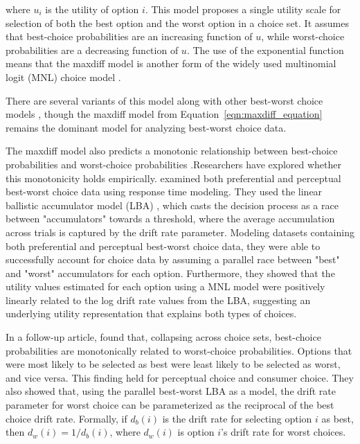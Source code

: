 where $u_{i}$ is the utility of option $i$. This model proposes a single utility scale  for selection of both the best option and the worst option in a choice set. It assumes that best-choice probabilities are an increasing function of $u$, while worst-choice probabilities are a decreasing function of $u$. The use of the exponential function means that the maxdiff model is another form of the widely used multinomial logit (MNL) choice model \parencite{hausman1984specification}. 

There are several variants of this model along with other best-worst choice models \parencite{marleyProbabilisticModelsBest2005,marleyProbabilisticModelsSetdependent2008,marleyModelsBestWorst2012,flynnBestWorstScaling2007,flynn2014best}, though the maxdiff model from Equation~\ref{eqn:maxdiff_equation} remains the dominant model for analyzing best-worst choice data.

The maxdiff model also predicts a monotonic relationship between best-choice probabilities and worst-choice probabilities \parencite{hawkinsBestTimesWorst2014}.Researchers have explored whether this monotonicity holds empirically. \textcite{hawkinsIntegratingCognitiveProcess2014a} examined both preferential and perceptual best-worst choice data using response time modeling. They used the linear ballistic accumulator model (LBA) \parencite{brownSimplestCompleteModel2008b}, which casts the decision process as a race between "accumulators" towards a threshold, where the average accumulation across trials is captured by the drift rate parameter. Modeling datasets containing both preferential and perceptual best-worst choice data, they were able to successfully account for choice data by assuming a parallel race between "best" and "worst" accumulators for each option. Furthermore, they showed that the utility values estimated for each option using a MNL model were positively linearly related to the log drift rate values from the LBA, suggesting an underlying utility representation that explains both types of choices. 

In a follow-up article, \textcite{hawkinsBestTimesWorst2014} found that, collapsing across choice sets, best-choice probabilities are monotonically related to worst-choice probabilities. Options that were most likely to be selected as best were least likely to be selected as worst, and vice versa. This finding held for perceptual choice and consumer choice. They also showed that, using the parallel best-worst LBA as a model, the drift rate parameter for worst choice can be parameterized as the reciprocal of the best choice drift rate. Formally, if $d_{b}(i)$ is the drift rate for selecting option $i$ as best, then $d_{w}(i)=1/d_{b}(i)$, where $d_{w}(i)$ is option $i$'s drift rate for worst choices. 

